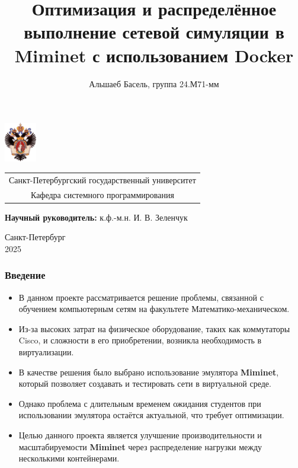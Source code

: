 \documentclass{beamer}
\title[Оптимизация Miminet]{Оптимизация и распределённое выполнение сетевой симуляции в Miminet с использованием Docker}
\institute[СПбГУ]{}
\author[Альшаеб Басель]{Альшаеб Басель, группа 24.М71-мм}
\begin{document}
{
\begin{frame}
  \includegraphics[width=1.4cm]{pictures/SPbGU_Logo.png}
\vspace{-35pt}
\hspace{-10pt}
\begin{center}
   \begin{tabular}{c}
        \scriptsize{Санкт-Петербургский государственный университет} \\
        \scriptsize{Кафедра системного программирования}
    \end{tabular}
\titlepage
\end{center}

\btVFill

{\scriptsize
   \textbf{Научный руководитель:} к.ф.-м.н. И. В. Зеленчук \\
 }
\begin{center}
  \vspace{5pt}
  \scriptsize{Санкт-Петербург\\
                 2025}
  \end{center}

\end{frame}
}

\begin{frame}[fragile]
  \frametitle{Введение}
  \begin{itemize}
    \item В данном проекте рассматривается решение проблемы, связанной с обучением компьютерным сетям на факультете Математико-механическом.
    \item Из-за высоких затрат на физическое оборудование, таких как коммутаторы Cisco, и сложности в его приобретении, возникла необходимость в виртуализации.
    \item В качестве решения было выбрано использование эмулятора \textbf{Miminet}, который позволяет создавать и тестировать сети в виртуальной среде.
    \item Однако проблема с длительным временем ожидания студентов при использовании эмулятора остаётся актуальной, что требует оптимизации.
    \item Целью данного проекта является улучшение производительности и масштабируемости \textbf{Miminet} через распределение нагрузки между несколькими контейнерами.
  \end{itemize}
\end{frame}
\end{document}
